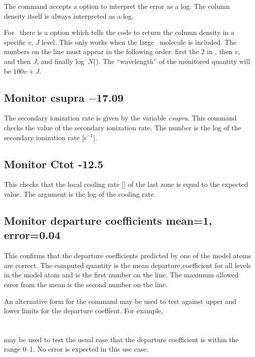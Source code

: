 The command accepts a  option to interpret
the error as a log.
The column density itself is always interpreted as a log.

For \htwo\ there is a  option which tells the code
to return the column density in a specific $v$, $J$ level.
This only works when the large \htwo\ molecule
is included.
The numbers on the line must appear in the following order:
first the 2 in , then $v$,
and then $J$, and finally log~$N$(\htwo).
The ``wavelength'' of the
monitored quantity will be $100v + J$.

\subsection{Monitor csupra $-$17.09}

The secondary ionization rate is given by the variable \emph{csupra}.
This command checks the value of the secondary ionization rate.
The number is the log of the secondary ionization rate [s$^{-1}$].

\subsection{Monitor Ctot -12.5}

This checks that the local cooling rate [\ergpccmps ]
of the last zone is equal to the expected value.
The argument is the log of the cooling rate.

\subsection{Monitor departure coefficients  mean=1, error=0.04}

This confirms that the departure coefficients predicted by one of the
model atoms are correct.
The computed quantity is the mean departure coefficient for all levels
in the model atom and is the first number on the line.
The maximum allowed error from the mean is the second number on the line.

An alternative form for the command may be used to test against upper
and lower limits for the departure coeffient.
For example,\\
%
\\
\\
%
\noindent
may be used to test the usual case that the departure coefficient
is within the range 0--1.
No error is expected in this use case.

